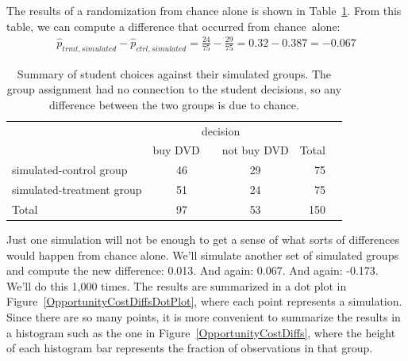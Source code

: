 The results of a randomization from chance alone is shown in Table~\ref{OpportunityCostTableSimulated}. From this table, we can compute a difference that occurred from chance~alone:
\begin{align*}
\hat{p}_{trmt, simulated} - \hat{p}_{ctrl, simulated}
  = \frac{24}{75} - \frac{29}{75}
  = 0.32 - 0.387
  = - 0.067
\end{align*}

\begin{table}[ht]
\centering
\begin{tabular}{l cc rr}
& \multicolumn{2}{c}{decision} \\
\cline{2-3}
				& {buy DVD}\ \  	& {not buy DVD} & Total & \hspace{3mm}  \\ 
\cline{1-4}
simulated-control group 		& 46		& 29	& 75 \\ 
simulated-treatment group 	& 51		& 24	& 75 \\ 
\cline{1-4}
Total				& 97		& 53	& 150
\end{tabular}
\caption{Summary of student choices against their simulated groups. The group assignment had no connection to the student decisions, so any difference between the two groups is due to chance.}
\label{OpportunityCostTableSimulated}
\end{table}

Just one simulation will not be enough to get a sense of what sorts of differences would happen from chance alone. We'll simulate another set of simulated groups and compute the new difference: 0.013. And again: 0.067. And again: -0.173. We'll do this 1,000 times. The results are summarized in a dot plot in Figure~\ref{OpportunityCostDiffsDotPlot}, where each point represents a simulation. Since there are so many points, it is more convenient to summarize the results in a histogram such as the one in Figure~\ref{OpportunityCostDiffs}, where the height of each histogram bar represents the fraction of observations in that group.

